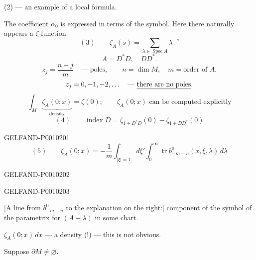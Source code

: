 (2) --- an example of a local formula.

The coefficient $\alpha_0$ is expressed in terms of the symbol. Here there naturally appears a $\zeta$-function
\[
(3)\qquad \zeta_A(s)=\sum_{\lambda\in\operatorname{Spec}A}\lambda^{-s}
\]
\[
A=D^*D,\quad DD^*.
\]
\[
z_j=\frac{n-j}{m}\quad\text{--- poles},\qquad
n=\dim M,\quad m=\text{order of }A.
\]
\[
z_j=0,-1,-2,\ldots\quad\text{--- \underline{there are no poles}.}
\]
\[
\int_M\underbrace{\zeta_A(0;x)}_{\text{density}}=\zeta(0);
\qquad \zeta_A(0;x)\text{ can be computed explicitly}
\]
\[
(4)\qquad \operatorname{index}D=\zeta_{1+D^*D}(0)-\zeta_{1+DD^*}(0)
\]


\begin{GelfandAdjacentEvidence}{GELFAND-P001020}{1}
\[
(5)\qquad
\zeta_A(0;x)=-\frac1m\int_{|\xi|=1}d\xi'
  \int_0^\infty\operatorname{tr} b^0_{-m-n}(x,\xi,\lambda)\,d\lambda
\]
\end{GelfandAdjacentEvidence}
\begin{GelfandAdjacentEvidence}{GELFAND-P001020}{2}

\end{GelfandAdjacentEvidence}
\begin{GelfandAdjacentEvidence}{GELFAND-P001020}{3}


[A line from $b^0_{-m-n}$ to the explanation on the right:]
component of the symbol of the parametrix for $(A-\lambda)$ in some chart.

$\zeta_A(0;x)\,dx$ --- a density (!) --- this is not obvious.

Suppose $\partial M\ne\varnothing$.
\end{GelfandAdjacentEvidence}
